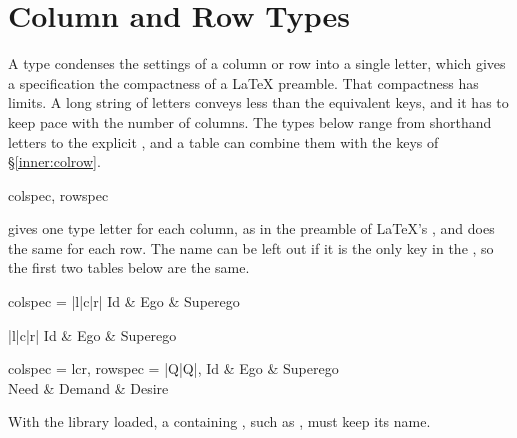 \section{Column and Row Types}\label{inner:types}
A type condenses the settings of a column or row into a single letter, which gives a specification the compactness of a \LaTeX{} preamble. That compactness has limits. A long string of letters conveys less than the equivalent keys, and it has to keep pace with the number of columns. The types below range from shorthand letters to the explicit , and a table can combine them with the keys of \S\ref{inner:colrow}.

\begin{codedescribe}[
    key,
    new=2021B,
    update=2021F
  ]{colspec, rowspec}
  \begin{codesyntax}
  \end{codesyntax}
   gives one type letter for each column, as in the preamble of \LaTeX's , and  does the same for each row. The name  can be left out if it is the only key in the , so the first two tables below are the same.

  \begin{codestore}[st=types:colspec]
    \begin{tblr}{colspec = {|l|c|r|}}
      Id & Ego & Superego
    \end{tblr}\quad
    \begin{tblr}{|l|c|r|}
      Id & Ego & Superego
    \end{tblr}\quad
    \begin{tblr}{
        colspec = {lcr},
        rowspec = {|Q|Q|},
      }
      Id   & Ego    & Superego \\
      Need & Demand & Desire
    \end{tblr}\end{codestore}
  \begin{center}
  \end{center}
  \begin{tsremark}
    With the  library loaded, a  containing \vrb{=}, such as , must keep its name.
  \end{tsremark}
\end{codedescribe}

